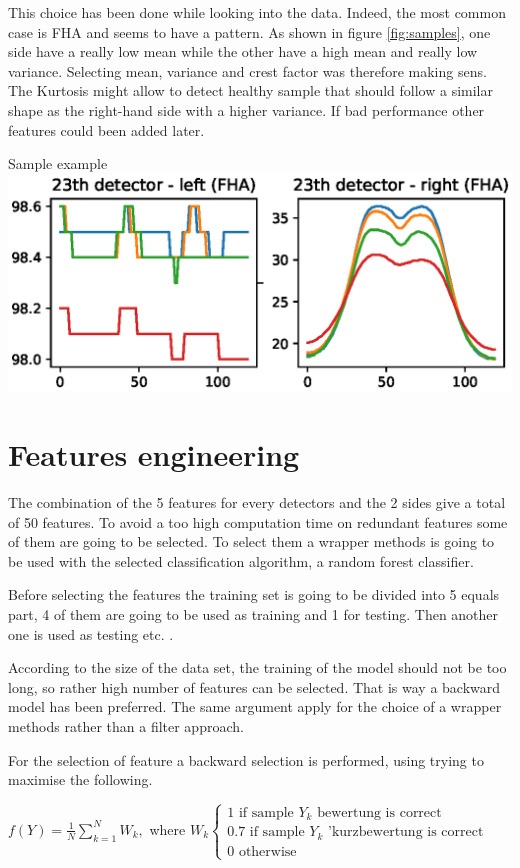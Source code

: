 This choice has been done while looking into the data. Indeed, the most common case is FHA and seems to have a pattern. As shown in figure \ref{fig:samples}, one side have a really low mean while the other have a high mean and really low variance. Selecting mean, variance and crest factor was therefore making sens. The Kurtosis might allow to detect healthy sample that should follow a similar shape as the right-hand side with a higher variance. If bad performance other features could been added later.

\createfigure[H]
  {}
    {Sample example}
    {\label{fig:samples}}
    {\includegraphics[width = \textwidth]{figures/sample.eps}}
    {}

\section{Features engineering}
The combination of the 5 features for every detectors and the 2 sides give a total of 50 features. To avoid a too high computation time on redundant features some of them are going to be selected. To select them a wrapper methods is going to be used with the selected classification algorithm, a random forest classifier. 

Before selecting the features the training set is going to be divided into 5 equals part, 4 of them are going to be used as training and 1 for testing. Then another one is used as testing etc. .

According to the size of the data set, the training of the model should not be too long, so rather high number of features can be selected. That is way a backward model has been preferred. The same argument apply for the choice of a wrapper methods rather than a filter approach. 

For the selection of feature a backward selection is performed, using trying to maximise the following.

  $f(Y)=\frac{1}{N} \sum_{k=1}^{N} W_{k},$ where $W_{k}\left\{\begin{array}{c}1 \text { if sample } Y_{k} \text { bewertung is correct } \\ 0.7 \text { if sample } Y_{k} \text { 'kurzbewertung is correct } \\ 0 \text { otherwise }\end{array}\right.$
  
